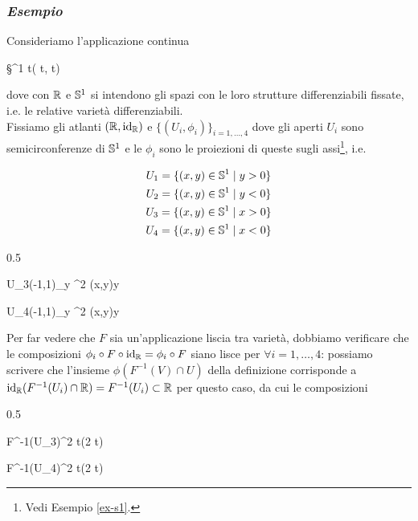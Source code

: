 \subsubsection{\textit{Esempio}}

Consideriamo l'applicazione continua

	{\R}{\S^{1}}
	{t}{( \pi t,  \pi t)}

dove con $ \R $ e $ \S^{1} $ si intendono gli spazi con le loro strutture differenziabili fissate, i.e. le relative varietà differenziabili.\\
Fissiamo gli atlanti $ (\R,\id_{\R}) $ e $ \{(U_{i},\phi_{i})\}_{i=1,\dots,4} $ dove gli aperti $ U_{i} $ sono semicirconferenze di $ \S^{1} $ e le $ \phi_{i} $ sono le proiezioni di queste sugli assi\footnote{%
	Vedi Esempio \ref{ex-s1}.%
}, i.e.

\begin{gather}
	U_{1} = \{ (x,y) \in \S^{1} \mid y>0 \}\\
	U_{2} = \{ (x,y) \in \S^{1} \mid y<0 \}\\
	U_{3} = \{ (x,y) \in \S^{1} \mid x>0 \}\\
	U_{4} = \{ (x,y) \in \S^{1} \mid x<0 \}
\end{gather}

	{0.5}{%
				{U_{3}}{(-1,1)_{y} \subset \R^{2}}
				{(x,y)}{y}
			
				{U_{4}}{(-1,1)_{y} \subset \R^{2}}
				{(x,y)}{y}
			}

Per far vedere che $ F $ sia un'applicazione liscia tra varietà, dobbiamo verificare che le composizioni $ \phi_{i} \circ F \circ \id_{\R} = \phi_{i} \circ F $ siano lisce per $ \forall i=1,\dots,4 $: possiamo scrivere che l'insieme $ \phi(F^{-1}(V) \cap U) $ della definizione corrisponde a $ \id_{\R}(F^{-1}(U_{i}) \cap \R) = F^{-1}(U_{i}) \subset \R $ per questo caso, da cui le composizioni

	{0.5}{%
				{F^{-1}(U_{3})}{\R^{2}}
				{t}{\sin(2 \pi t)}
			
				{F^{-1}(U_{4})}{\R^{2}}
				{t}{\sin(2 \pi t)}
			}

